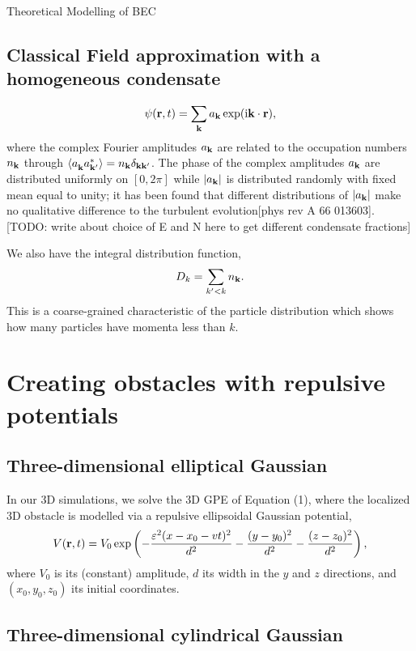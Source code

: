 \begin{chapter}{\label{cha:theoretical_model}Theoretical Modelling of BEC}
	\subsection{\label{section:cfield} Classical Field approximation with a homogeneous condensate}
		\begin{equation}
		\psi({\bf r},t) = \sum_{\bf k} a_{\bf k} \exp (\mathrm{i}{\bf k}\cdot{\bf r}),
		\label{eq:cFieldIC}
		\end{equation}
		where the complex Fourier amplitudes $a_{\bf k}$ are related to the occupation numbers $n_{\bf k}$ through $\braket{a_{\bf k}^{\,}a_{\bf k'}^*} = n_{\bf k}\delta_{\bf kk'}$. The phase of the complex amplitudes $a_{\bf k}$ are distributed uniformly on $[0,2\pi]$ while $|a_{\bf k}|$ is distributed randomly with fixed mean equal to unity; it has been found that different distributions of $|a_{\bf k}|$ make no qualitative difference to the turbulent evolution[phys rev A 66 013603]. [TODO: write about choice of E and N here to get different condensate fractions]

		We also have the integral distribution function,
		\begin{equation}
		D_k = \sum_{k'<k}n_{\bf k}.
		\label{eq:intDistFunc}
		\end{equation}
		This is a coarse-grained characteristic of the particle distribution which shows how many particles have momenta less than $k$.

\section{\label{section:potentials}Creating obstacles with repulsive potentials}

\subsection{\label{section:3dobjpotential} Three-dimensional elliptical Gaussian}
In our 3D simulations, we solve the 3D GPE of Equation (1), where the localized 3D obstacle is modelled via a repulsive ellipsoidal Gaussian potential,
\begin{equation}
V({\bf r}, t)=V_0 \exp \left( -\frac{\varepsilon^2(x-x_0-vt)^2}{d^2} -\frac{(y-y_0)^2}{d^2}-\frac{(z-z_0)^2}{d^2}\right),
\label{eq:potential3D}
\end{equation}
where  $V_0$ is its (constant) amplitude, $d$ its width in the $y$ and $z$ directions, and $(x_0,y_0,z_0)$ its initial coordinates.  

\subsection{\label{section:3dcylinderpotential} Three-dimensional cylindrical Gaussian}

\end{chapter}
